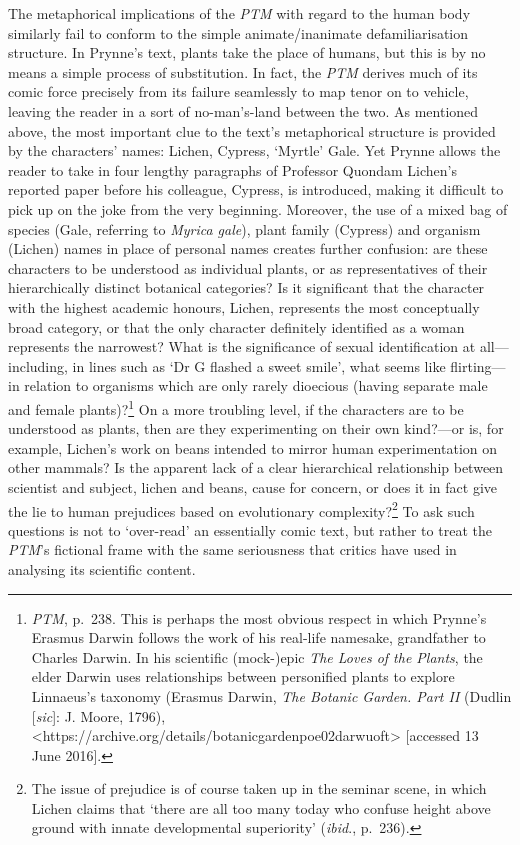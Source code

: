 \documentclass[]{article}
\begin{document}
The metaphorical implications of the \emph{PTM} with regard to the human
body similarly fail to conform to the simple animate/inanimate
defamiliarisation structure. In Prynne’s text, plants take the place of
humans, but this is by no means a simple process of substitution. In
fact, the \emph{PTM} derives much of its comic force precisely from its
failure seamlessly to map tenor on to vehicle, leaving the reader in a
sort of no-man’s-land between the two. As mentioned above, the most
important clue to the text’s metaphorical structure is provided by the
characters’ names: Lichen, Cypress, ‘Myrtle’ Gale. Yet Prynne allows the
reader to take in four lengthy paragraphs of Professor Quondam Lichen’s
reported paper before his colleague, Cypress, is introduced, making it
difficult to pick up on the joke from the very beginning. Moreover, the
use of a mixed bag of species (Gale, referring to \emph{Myrica gale}),
plant family (Cypress) and organism (Lichen) names in place of personal
names creates further confusion: are these characters to be understood
as individual plants, or as representatives of their hierarchically
distinct botanical categories? Is it significant that the character with
the highest academic honours, Lichen, represents the most conceptually
broad category, or that the only character definitely identified as a
woman represents the narrowest? What is the significance of sexual
identification at all—including, in lines such as ‘Dr G flashed a sweet
smile’, what seems like flirting—in relation to organisms which are only
rarely dioecious (having separate male and female plants)?\footnote{\emph{PTM},
  p.~238. This is perhaps the most obvious respect in which Prynne’s
  Erasmus Darwin follows the work of his real-life namesake, grandfather
  to Charles Darwin. In his scientific (mock-)epic \emph{The Loves of
  the Plants}, the elder Darwin uses relationships between personified
  plants to explore Linnaeus’s taxonomy (Erasmus Darwin, \emph{The
  Botanic Garden. Part II} (Dudlin {[}\emph{sic}{]}: J. Moore, 1796),
  \textless{}https://archive.org/details/botanicgardenpoe02darwuoft\textgreater{}
  {[}accessed 13 June 2016{]}.} On a more troubling level, if the
characters are to be understood as plants, then are they experimenting
on their own kind?—or is, for example, Lichen’s work on beans intended
to mirror human experimentation on other mammals? Is the apparent lack
of a clear hierarchical relationship between scientist and subject,
lichen and beans, cause for concern, or does it in fact give the lie to
human prejudices based on evolutionary complexity?\footnote{The issue of
  prejudice is of course taken up in the seminar scene, in which Lichen
  claims that ‘there are all too many today who confuse height above
  ground with innate developmental superiority’ (\emph{ibid}., p.~236).}
To ask such questions is not to ‘over-read’ an essentially comic text,
but rather to treat the \emph{PTM}’s fictional frame with the same
seriousness that critics have used in analysing its scientific content.
\end{document}
